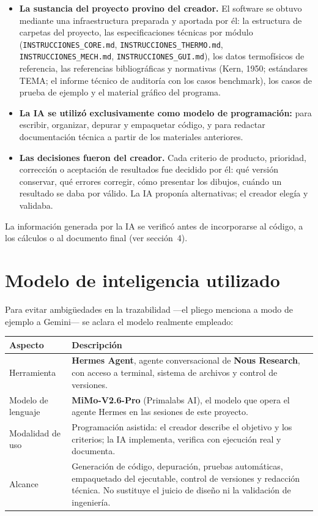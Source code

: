 \documentclass[11pt,a4paper]{article}
\begin{document}
\begin{itemize}
\item \textbf{La sustancia del proyecto provino del creador.} El software se
obtuvo mediante una infraestructura preparada y aportada por él: la estructura
de carpetas del proyecto, las especificaciones técnicas por módulo
(\texttt{INSTRUCCIONES\_CORE.md}, \texttt{INSTRUCCIONES\_THERMO.md},
\texttt{INSTRUCCIONES\_MECH.md}, \texttt{INSTRUCCIONES\_GUI.md}), los datos
termofísicos de referencia, las referencias bibliográficas y normativas
(Kern, 1950; estándares TEMA; el informe técnico de auditoría con los casos
benchmark), los casos de prueba de ejemplo y el material gráfico del programa.
\item \textbf{La IA se utilizó exclusivamente como modelo de programación:}
para escribir, organizar, depurar y empaquetar código, y para redactar
documentación técnica a partir de los materiales anteriores.
\item \textbf{Las decisiones fueron del creador.} Cada criterio de producto,
prioridad, corrección o aceptación de resultados fue decidido por él: qué
versión conservar, qué errores corregir, cómo presentar los dibujos, cuándo
un resultado se daba por válido. La IA proponía alternativas; el creador
elegía y validaba.
\end{itemize}

La información generada por la IA se verificó antes de incorporarse al código,
a los cálculos o al documento final (ver sección~4).

\section{Modelo de inteligencia utilizado}

Para evitar ambigüedades en la trazabilidad —el pliego menciona a modo de
ejemplo a Gemini— se aclara el modelo realmente empleado:

\begin{center}
\begin{tabular}{@{}p{4.2cm}p{9.6cm}@{}}
\toprule
\rowcolor{seccion}
\textbf{Aspecto} & \textbf{Descripción} \\
\midrule
Herramienta & \textbf{Hermes Agent}, agente conversacional de
\textbf{Nous Research}, con acceso a terminal, sistema de archivos y
control de versiones. \\
Modelo de lenguaje & \textbf{MiMo-V2.6-Pro} (Primalabs AI), el modelo que
opera el agente Hermes en las sesiones de este proyecto. \\
Modalidad de uso & Programación asistida: el creador describe el objetivo y
los criterios; la IA implementa, verifica con ejecución real y documenta. \\
Alcance & Generación de código, depuración, pruebas automáticas,
empaquetado del ejecutable, control de versiones y redacción técnica.
No sustituye el juicio de diseño ni la validación de ingeniería. \\
\bottomrule
\end{tabular}
\end{center}
\end{document}
